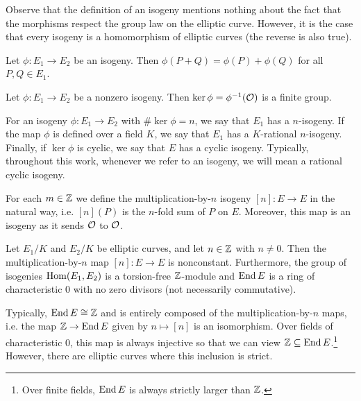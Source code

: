 Observe that the definition of an isogeny mentions nothing about the fact that the morphisms respect the group law on the elliptic curve. However, it is the case that every isogeny is a homomorphism of elliptic curves (the reverse is also true). 


\begin{thm}
Let $\phi: E_1 \to E_2$ be an isogeny. Then $\phi(P + Q)= \phi(P) + \phi(Q)$ for all $P, Q \in E_1$.
\end{thm}


\begin{cor}
Let $\phi: E_1 \to E_2$ be a nonzero isogeny. Then $\ker \phi= \phi^{-1}(\mathcal{O})$ is a finite group.
\end{cor}


For an isogeny $\phi: E_1 \to E_2$ with $\#\ker \phi= n$, we say that $E_1$ has a $n$-isogeny. If the map $\phi$ is defined over a field $K$, we say that $E_1$ has a $K$-rational $n$-isogeny. Finally, if $\ker \phi$ is cyclic, we say that $E$ has a cyclic isogeny. Typically, throughout this work, whenever we refer to an isogeny, we will mean a rational cyclic isogeny. 


\begin{ex}
For each $m \in \mathbb{Z}$ we define the multiplication-by-$n$ isogeny $[n]: E \to E$ in the natural way, i.e. $[n](P)$ is the $n$-fold sum of $P$ on $E$. Moreover, this map is an isogeny as it sends $\mathcal{O}$ to $\mathcal{O}$. 
\end{ex}


\begin{prop}
Let $E_1/K$ and $E_2/K$ be elliptic curves, and let $n \in \mathbb{Z}$ with $n \neq 0$. Then the multiplication-by-$n$ map $[n]: E \to E$ is nonconstant. Furthermore, the group of isogenies $\operatorname{Hom}(E_1, E_2)$ is a torsion-free $\mathbb{Z}$-module and $\operatorname{End} E$ is a ring of characteristic 0 with no zero divisors (not necessarily commutative). 
\end{prop}


Typically, $\operatorname{End} E \cong \mathbb{Z}$ and is entirely composed of the multiplication-by-$n$ maps, i.e. the map $\mathbb{Z} \to \operatorname{End} E$ given by $n \mapsto [n]$ is an isomorphism. Over fields of characteristic 0, this map is always injective so that we can view $\mathbb{Z} \subseteq \operatorname{End} E$.\footnote{Over finite fields, $\operatorname{End} E$ is always strictly larger than $\mathbb{Z}$.} However, there are elliptic curves where this inclusion is strict. 



